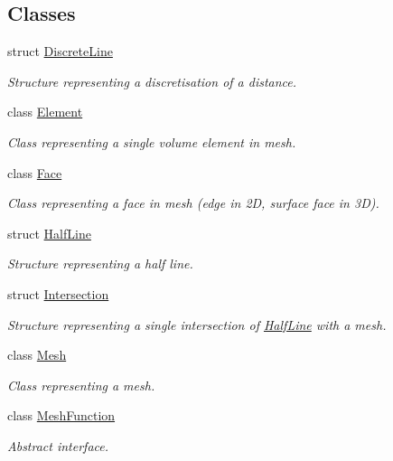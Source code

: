 \subsection*{Classes}
\begin{DoxyCompactItemize}
\item 
struct \hyperlink{structraytracer_1_1geometry_1_1DiscreteLine}{Discrete\+Line}
\begin{DoxyCompactList}\small\item\em Structure representing a discretisation of a distance. \end{DoxyCompactList}\item 
class \hyperlink{classraytracer_1_1geometry_1_1Element}{Element}
\begin{DoxyCompactList}\small\item\em Class representing a single volume element in mesh. \end{DoxyCompactList}\item 
class \hyperlink{classraytracer_1_1geometry_1_1Face}{Face}
\begin{DoxyCompactList}\small\item\em Class representing a face in mesh (edge in 2D, surface face in 3D). \end{DoxyCompactList}\item 
struct \hyperlink{structraytracer_1_1geometry_1_1HalfLine}{Half\+Line}
\begin{DoxyCompactList}\small\item\em Structure representing a half line. \end{DoxyCompactList}\item 
struct \hyperlink{structraytracer_1_1geometry_1_1Intersection}{Intersection}
\begin{DoxyCompactList}\small\item\em Structure representing a single intersection of \hyperlink{structraytracer_1_1geometry_1_1HalfLine}{Half\+Line} with a mesh. \end{DoxyCompactList}\item 
class \hyperlink{classraytracer_1_1geometry_1_1Mesh}{Mesh}
\begin{DoxyCompactList}\small\item\em Class representing a mesh. \end{DoxyCompactList}\item 
class \hyperlink{classraytracer_1_1geometry_1_1MeshFunction}{Mesh\+Function}
\begin{DoxyCompactList}\small\item\em Abstract interface. \end{DoxyCompactList}\item 

\end{DoxyCompactItemize}
